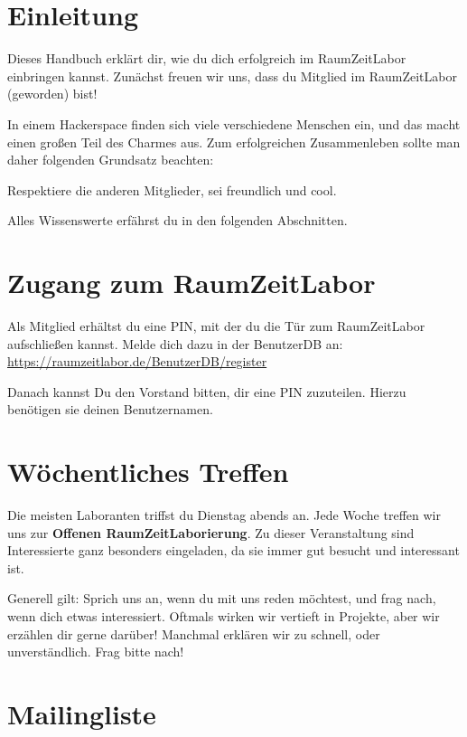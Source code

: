 \documentclass[12pt, DIV16, a4paper]{scrartcl}
\begin{document}
\pagestyle{fancy}
\newcommand{\np}{\bigskip\noindent}
\setlength{\parindent}{0pt}

\section*{Einleitung}

Dieses Handbuch erklärt dir, wie du dich erfolgreich im RaumZeitLabor
einbringen kannst. Zunächst freuen wir uns, dass du Mitglied im RaumZeitLabor
(geworden) bist!
\np

In einem Hackerspace finden sich viele verschiedene Menschen ein, und das macht
einen großen Teil des Charmes aus. Zum erfolgreichen Zusammenleben sollte man
daher folgenden Grundsatz beachten:

\begin{center}
	Respektiere die anderen Mitglieder, sei freundlich und cool.
\end{center}

Alles Wissenswerte erfährst du in den folgenden Abschnitten.

\section*{Zugang zum RaumZeitLabor}

Als Mitglied erhältst du eine PIN, mit der du die Tür zum RaumZeitLabor
aufschließen kannst. Melde dich dazu in der BenutzerDB an:
\url{https://raumzeitlabor.de/BenutzerDB/register}

Danach kannst Du den Vorstand bitten, dir eine PIN zuzuteilen. Hierzu benötigen
sie deinen Benutzernamen.

\section*{Wöchentliches Treffen}

Die meisten Laboranten triffst du Dienstag abends an. Jede Woche treffen wir
uns zur \textbf{Offenen RaumZeitLaborierung}. Zu dieser Veranstaltung sind
Interessierte ganz besonders eingeladen, da sie immer gut besucht und
interessant ist.
\np

Generell gilt: Sprich uns an, wenn du mit uns reden möchtest, und frag nach,
wenn dich etwas interessiert. Oftmals wirken wir vertieft in Projekte, aber wir
erzählen dir gerne darüber! Manchmal erklären wir zu schnell, oder
unverständlich. Frag bitte nach!

\section*{Mailingliste}
\end{document}
